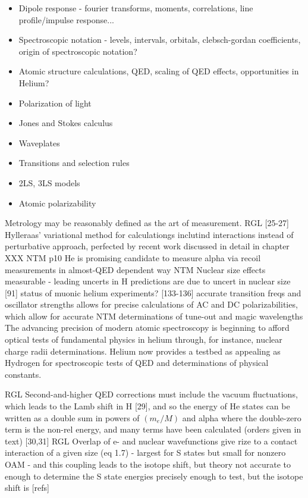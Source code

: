 \begin{itemize}
	\item Dipole response - fourier transforms, moments, correlations, line profile/impulse response...
	\item Spectroscopic notation - levels, intervals, orbitals, clebsch-gordan coefficients, origin of spectroscopic notation?
	\item Atomic structure calculations, QED, scaling of QED effects, opportunities in Helium?
	\item Polarization of light
	\item Jones and Stokes calculus
	\item Waveplates
	\item Transitions and selection rules
	\item 2LS, 3LS models
	\item Atomic polarizability
\end{itemize}
Metrology may be reasonably defined as the art of measurement.
RGL [25-27] Hylleraas' variational method for calculationgs inclutind interactions instead of perturbative approach, perfected by recent work discussed in detail in chapter XXX
NTM p10 He is promising candidate to measure alpha via recoil measurements in almost-QED dependent way 
NTM Nuclear size effects measurable - leading uncerts in H predictions are due to uncert in nuclear size [91] 
		status of muonic helium experiments?
[133-136] accurate transition freqs and oscillator strengths allows for precise calculations of AC and DC polarizabilities, which allow for accurate NTM determinations of tune-out and magic wavelengths 
The advancing precision of modern atomic spectroscopy is beginning to afford optical tests of fundamental physics in helium through, for instance, nuclear charge radii determinations.
	Helium now provides a testbed as appealing as Hydrogen for spectroscopic tests of QED and determinations of physical constants.
	
			RGL Second-and-higher QED corrections must include the vacuum fluctuations, which leads to the Lamb shift in H [29], and so the energy of He states can be written as a double sum in powers of $(m_e/M)$ and alpha where the double-zero term is the non-rel energy, and many terms have been calculated (orders given in text) [30,31]  
			RGL Overlap of e- and nuclear wavefunctions give rize to a contact interaction of a given size (eq 1.7) - largest for S states but small for nonzero OAM - and this coupling leads to the isotope shift, but theory not accurate to enough to determine the S state energies precisely enough to test, but the isotope shift is [refs] 

